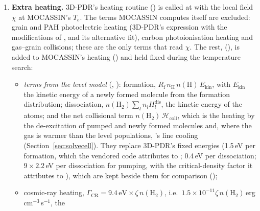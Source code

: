 \begin{enumerate}
  spontaneous rate $A_{ul}\beta$ and the radiative rates driven by
  $\beta J_{\mathrm{bg}}$ (), where the background
  $J_{\mathrm{bg}}$ is MOCASSIN's own $J_\nu$ at the line plus the CMB
  (). The cooling is the net escaping power,
  $\Lambda_{ul}=A_{ul}h\nu_{ul}n_u\beta\,(S_{ul}-J_{\mathrm{bg}})/S_{ul}$ with
  $S_{ul}$ the line source function ().
\item \textbf{Extra heating.} 3D-PDR's heating routine 
  () is called at 
  with the local field $\chi$ at MOCASSIN's $T_e$. The terms MOCASSIN computes
  itself are excluded: grain and PAH photoelectric heating (3D-PDR's
  \citealt{BakesTielens1994} expression with the modifications of
  \citealt{Wolfire2003}, and its alternative \citealt{WeingartnerDraine2001}
  fit), carbon photoionisation heating and gas--grain collisions; these are
  the only terms that read $\chi$. The rest, 
  (), is added to MOCASSIN's heating
  () and held fixed during the temperature search:
  \begin{itemize}
  \item \emph{\Htwo{} terms from the level model} (,
    ): formation, $R_{\mathrm f}\,n_{\mathrm H}\,n(\mathrm H)\,E_{\mathrm{kin}}$,
    with $E_{\mathrm{kin}}$ the kinetic energy of a newly formed molecule from the
    formation distribution; dissociation, $n(\mathrm{H_2})\sum_l n_l H^{\mathrm{dis}}_l$,
    the kinetic energy of the atoms; and the net collisional term
    $n(\mathrm{H_2})\,\mathcal{H}_{\mathrm{coll}}$, which is the heating by the
    de-excitation of pumped and newly formed molecules and, where the gas is
    warmer than the level populations, \Htwo's line cooling
    (Section~\ref{sec:solvecell}). They replace 3D-PDR's fixed energies
    (1.5\,eV per formation, which the vendored code attributes to
    \citealt{HollenbachTielens1999}; 0.4\,eV per dissociation;
    $9\times2.2$\,eV per dissociation for pumping, with the critical-density
    factor it attributes to \citealt{HollenbachMcKee1979}), which are kept
    beside them for comparison ();
  \item cosmic-ray heating, $\Gamma_{\mathrm{CR}}=9.4\,\mathrm{eV}\times\zeta\,n(\mathrm{H_2})$,
    i.e.\ $1.5\times10^{-11}\zeta\,n(\mathrm{H_2})$\,erg\,cm$^{-3}$\,s$^{-1}$, the

\end{itemize}
\end{enumerate}
